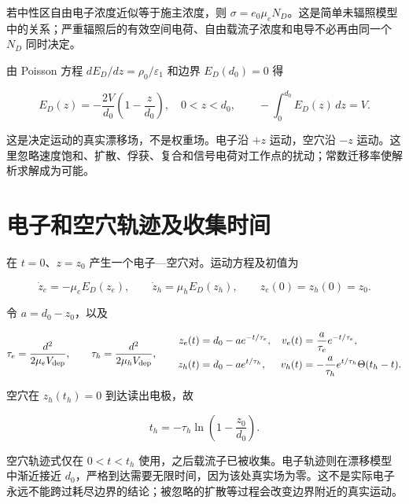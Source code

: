 \documentclass[
  11pt,
  a4paper,
  oneside,
  openany]{report}
\numberwithin{equation}{chapter}
\begin{document}
若中性区自由电子浓度近似等于施主浓度，则
\(\sigma=e_0\mu_eN_D\)。这是简单未辐照模型中的关系；严重辐照后的有效空间电荷、自由载流子浓度和电导不必再由同一个
\(N_D\) 同时决定。

由 Poisson 方程 \(dE_D/dz=\rho_0/\varepsilon_1\) 和边界 \(E_D(d_0)=0\)
得

\nopagebreak[3]
\begin{equation}
E_D(z)=-\frac{2V}{d_0}\left(1-\frac{z}{d_0}\right),\quad 0<z<d_0,
\qquad -\int_0^{d_0}E_D(z)\,dz=V.
\end{equation}

这是决定运动的真实漂移场，不是权重场。电子沿 \(+z\) 运动，空穴沿 \(-z\)
运动。这里忽略速度饱和、扩散、俘获、复合和信号电荷对工作点的扰动；常数迁移率使解析求解成为可能。

\section{电子和空穴轨迹及收集时间}\label{sec-silicon-trajectories}

在 \(t=0\)、\(z=z_0\) 产生一个电子---空穴对。运动方程及初值为

\nopagebreak[3]
\begin{equation}
\dot z_e=-\mu_e E_D(z_e),\qquad
\dot z_h=\mu_h E_D(z_h),\qquad z_e(0)=z_h(0)=z_0.
\end{equation}

令 \(a=d_0-z_0\)，以及

\nopagebreak[3]
\begin{equation}
\tau_e=\frac{d^2}{2\mu_eV_{\rm dep}},\qquad
\tau_h=\frac{d^2}{2\mu_hV_{\rm dep}},
\qquad
\begin{aligned}
z_e(t)&=d_0-ae^{-t/\tau_e}, & v_e(t)&=\frac{a}{\tau_e}e^{-t/\tau_e},\\
z_h(t)&=d_0-ae^{t/\tau_h}, & v_h(t)&=-\frac{a}{\tau_h}e^{t/\tau_h}\Theta(t_h-t).
\end{aligned}
\end{equation}

空穴在 \(z_h(t_h)=0\) 到达读出电极，故

\nopagebreak[3]
\begin{equation}
t_h=-\tau_h\ln\left(1-\frac{z_0}{d_0}\right).
\end{equation}

空穴轨迹式仅在 \(0<t<t_h\)
使用，之后载流子已被收集。电子轨迹则在漂移模型中渐近接近
\(d_0\)，严格到达需要无限时间，因为该处真实场为零。这不是实际电子永远不能跨过耗尽边界的结论；被忽略的扩散等过程会改变边界附近的真实运动。
\end{document}
